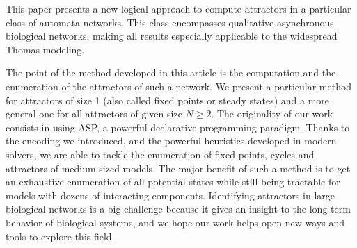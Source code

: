 This paper presents a new logical approach to compute attractors
in a particular class of automata networks.
This class encompasses qualitative asynchronous biological networks,
making all results especially applicable to the widespread Thomas modeling.

The point of the method developed in this article is the computation and
the enumeration of the attractors of such a network.
We present a particular method for attractors of size 1 (also called fixed points or steady states)
and a more general one for all attractors of given size $N \geq 2$.
The originality of our work consists in using ASP, a powerful declarative programming paradigm.
Thanks to the encoding we introduced, and the powerful heuristics developed in modern solvers, we are able to tackle the enumeration of fixed points, cycles and attractors of medium-sized models.
The major benefit of such a method is to get an exhaustive enumeration of all potential states while still being tractable for models with dozens of interacting components.
Identifying attractors in large biological networks is a big challenge because it gives an insight to the long-term behavior of biological systems,
and we hope our work helps open new ways and tools to explore this field.




%
